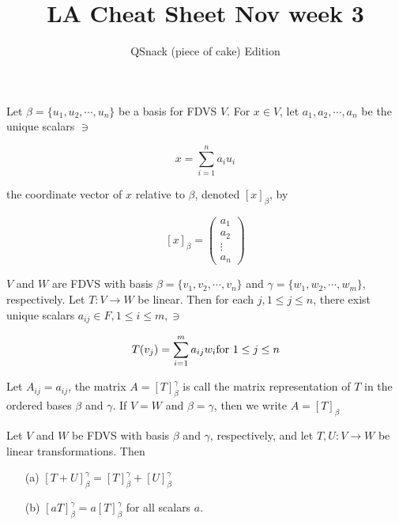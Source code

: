


\title{LA Cheat Sheet Nov week 3}

\author{QSnack (piece of cake) Edition}

\maketitle



\begin{defn}
	Let $\beta = \{ u_1, u_2, \cdots, u_n\}$ be a basis for FDVS $V$. For $x \in V$, let $a_1,a_2,\cdots,a_n$ be the unique scalars $\ni$
	
	$$x = \sum^n_{i=1}a_iu_i$$
	
	the coordinate vector of $x$ relative to $\beta$, denoted $[x]_{\beta}$, by
	
	$$[x]_{\beta} = \left(
	\begin{matrix}
	a_1 \\ a_2 \\ \vdots \\ a_n
	\end{matrix}
	\right)$$
	
\end{defn}

\begin{defn}
	$V$ and $W$ are FDVS with basis $\beta = \{v_1,v_2,\cdots,v_n\}$ and $\gamma = \{w_1,w_2,\cdots,w_m\}$, respectively. Let $T: V \rightarrow W$ be linear. Then for each $j, 1 \leq j \leq n$, there exist unique scalars $a_{ij} \in F, 1 \leq i \leq m, \ni$
	
	$$T(v_j) = \sum^m_{i = 1} a_{ij}w_{i} \vspace{10pt} \text{for } 1 \leq j \leq n$$
	
	Let $A_{ij} = a_{ij}$, the matrix $A = [T]^{\gamma}_{\beta}$ is call the matrix representation of $T$ in the ordered bases $\beta$ and $\gamma$. If $V = W$ and $\beta = \gamma$, then we write $A = [T]_{\beta}$
\end{defn}

\begin{thm*}
	Let $V$ and $W$ be FDVS with basis $\beta$ and $\gamma$, respectively, and let $T,U: V \rightarrow W$ be linear transformations. Then
	
\begin{enumerate}
	\item[(a)] $[T + U]^{\gamma}_{\beta} = [T]^{\gamma}_{\beta} + [U]^{\gamma}_{\beta}$
	\item[(b)] $[aT]^{\gamma}_{\beta} = a[T]^{\gamma}_{\beta}$ for all scalars $a$.	
\end{enumerate}		
	
\end{thm*}










